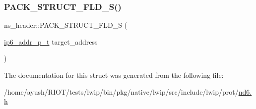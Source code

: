 \mbox{\label{structns__header_a9afca416f5a3caff1d19744d8f89a571}} 
\subsubsection{\texorpdfstring{P\+A\+C\+K\+\_\+\+S\+T\+R\+U\+C\+T\+\_\+\+F\+L\+D\+\_\+\+S()}{PACK\_STRUCT\_FLD\_S()}\hspace{0.1cm}{\footnotesize\ttfamily [2/2]}}
{\footnotesize\ttfamily ns\+\_\+header\+::\+P\+A\+C\+K\+\_\+\+S\+T\+R\+U\+C\+T\+\_\+\+F\+L\+D\+\_\+S (\begin{DoxyParamCaption}\item[{\hyperlink{native_2lwip_2src_2include_2lwip_2prot_2ip6_8h_a560932a657f17ec5a0a3a78a1ce7e60a}{ip6\+\_\+addr\+\_\+p\+\_\+t}}]{target\+\_\+address }\end{DoxyParamCaption})}



The documentation for this struct was generated from the following file\+:\begin{DoxyCompactItemize}
\item 
/home/ayush/\+R\+I\+O\+T/tests/lwip/bin/pkg/native/lwip/src/include/lwip/prot/\hyperlink{native_2lwip_2src_2include_2lwip_2prot_2nd6_8h}{nd6.\+h}\end{DoxyCompactItemize}
